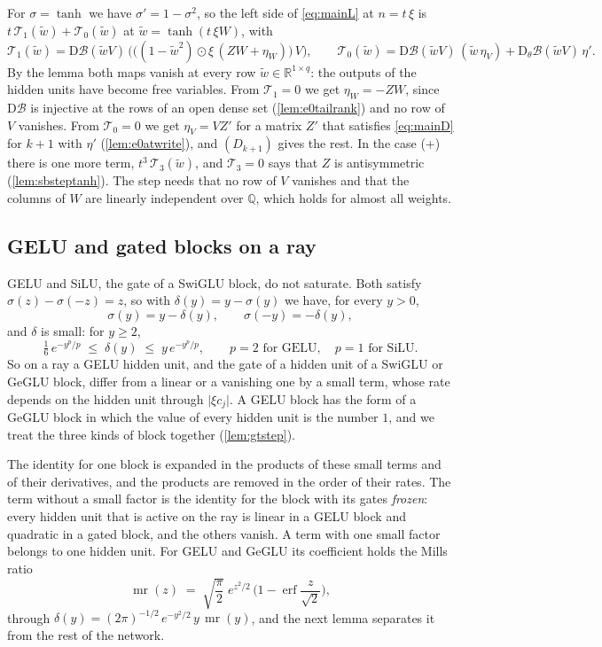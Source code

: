 \documentclass[10pt]{article}
\theoremstyle{definition}
\theoremstyle{remark}
\newcommand{\R}{\mathbb{R}}
\newcommand{\Der}{\mathrm{D}}
\begin{document}
For $\sigma = \tanh$ we have $\sigma' = 1 - \sigma^2$, so the left side of \eqref{eq:mainL} at $n = t\,\xi$ is $t\,\mathcal T_1(\tilde w) + \mathcal T_0(\tilde w)$ at $\tilde w = \tanh(t\,\xi W)$, with
\[
\mathcal T_1(\tilde w) = \Der\mathcal B(\tilde wV)\,\Big(\big((1 - \tilde w^2)\odot\xi\,(ZW + \eta_W)\big)\,V\Big), \qquad \mathcal T_0(\tilde w) = \Der\mathcal B(\tilde wV)\,(\tilde w\,\eta_V) + \Der_\theta\mathcal B(\tilde wV)\,\eta' .
\]
By the lemma both maps vanish at every row $\tilde w \in \R^{1\times q}$: the outputs of the hidden units have become free variables. From $\mathcal T_1 = 0$ we get $\eta_W = -ZW$, since $\Der\mathcal B$ is injective at the rows of an open dense set (\cref{lem:e0tailrank}) and no row of $V$ vanishes. From $\mathcal T_0 = 0$ we get $\eta_V = VZ'$ for a matrix $Z'$ that satisfies \eqref{eq:mainD} for $k+1$ with $\eta'$ (\cref{lem:e0atwrite}), and $(D_{k+1})$ gives the rest. In the case (+) there is one more term, $t^3\,\mathcal T_3(\tilde w)$, and $\mathcal T_3 = 0$ says that $Z$ is antisymmetric (\cref{lem:sbsteptanh}). The step needs that no row of $V$ vanishes and that the columns of $W$ are linearly independent over $\mathbb Q$, which holds for almost all weights.

\subsection{GELU and gated blocks on a ray}\label{sec:raysgelu}

GELU and SiLU, the gate of a SwiGLU block, do not saturate. Both satisfy $\sigma(z) - \sigma(-z) = z$, so with $\delta(y) = y - \sigma(y)$ we have, for every $y > 0$,
\[
\sigma(y) = y - \delta(y), \qquad \sigma(-y) = -\delta(y),
\]
and $\delta$ is small: for $y \ge 2$,
\[
\tfrac16\,e^{-y^p/p} \;\le\; \delta(y) \;\le\; y\,e^{-y^p/p}, \qquad p = 2 \text{ for GELU}, \quad p = 1 \text{ for SiLU} .
\]
So on a ray a GELU hidden unit, and the gate of a hidden unit of a SwiGLU or GeGLU block, differ from a linear or a vanishing one by a small term, whose rate depends on the hidden unit through $\lvert\xi c_j\rvert$. A GELU block has the form of a GeGLU block in which the value of every hidden unit is the number $1$, and we treat the three kinds of block together (\cref{lem:gtstep}).

The identity for one block is expanded in the products of these small terms and of their derivatives, and the products are removed in the order of their rates. The term without a small factor is the identity for the block with its gates \emph{frozen}: every hidden unit that is active on the ray is linear in a GELU block and quadratic in a gated block, and the others vanish. A term with one small factor belongs to one hidden unit. For GELU and GeGLU its coefficient holds the Mills ratio
\[
\operatorname{mr}(z) \;=\; \sqrt{\frac{\pi}{2}}\;e^{z^2/2}\,\Big(1 - \operatorname{erf}\frac{z}{\sqrt2}\Big),
\]
through $\delta(y) = (2\pi)^{-1/2}\,e^{-y^2/2}\,y\,\operatorname{mr}(y)$, and the next lemma separates it from the rest of the network.
\end{document}
